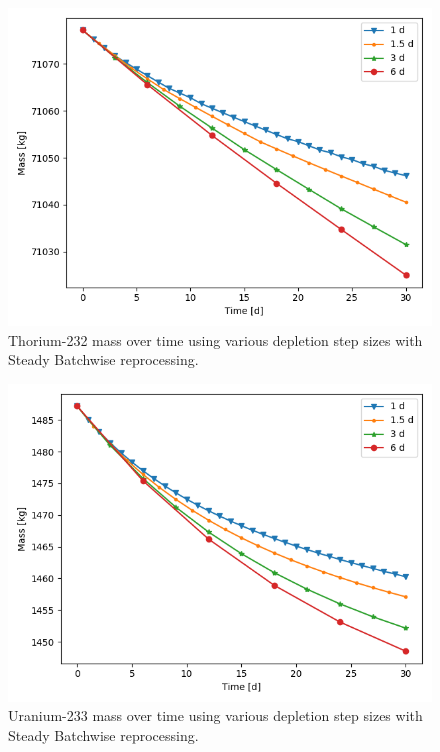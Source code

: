 \begin{figure}[H]
  \centering
  \includegraphics[scale=0.7]{images/Th232_sp_comp.png}
  \caption{Thorium-232 mass over time using various depletion step sizes with Steady Batchwise reprocessing.}
   \label{fig:steady-batch-th}
\end{figure}

\begin{figure}[H]
  \centering
  \includegraphics[scale=0.7]{images/U233_sp_comp.png}
  \caption{Uranium-233 mass over time using various depletion step sizes with Steady Batchwise reprocessing.}
   \label{fig:steady-batch-u}
\end{figure}

